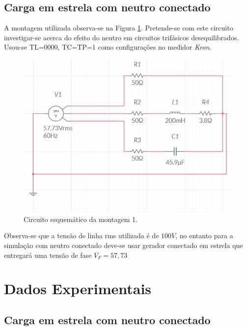 \documentclass[a4paper,12pt,oneside,openany,table,xcdraw]{article}
\begin{document}
\subsection{Carga em estrela com neutro conectado}
A montagem utilizada observa-se na Figura \ref{m1:esquema}. Pretende-se com este circuito investigar-se acerca do efeito do neutro em circuitos trifásicos desequilibrados. Usou-se TL=0000, TC=TP=1 como configurações no medidor \emph{Kron}.
\begin{figure}[H]
\centering
\captionsetup{font=scriptsize}
\includegraphics[width=14cm]{m1-esquema}
\caption{Circuito esquemático da montagem 1.}
\label{m1:esquema}
\end{figure}
Observa-se que a tensão de linha rms utilizada é de $100V$, no entanto para a simulação com neutro conectado deve-se usar gerador conectado em estrela que entregará uma tensão de fase $V_F=57,73$

\section{Dados Experimentais}

\subsection{Carga em estrela com neutro conectado}
\end{document}
